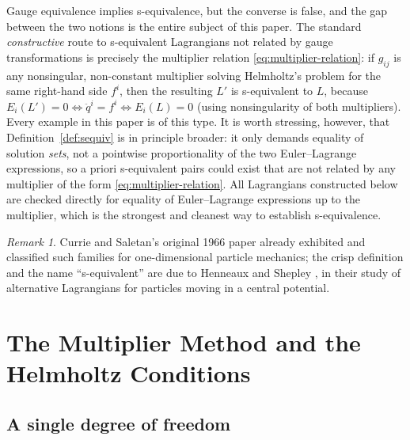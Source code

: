 \documentclass[11pt]{article}
\theoremstyle{remark}
\newtheorem{remark}{Remark}[section]
\begin{document}
Gauge equivalence implies s-equivalence, but the converse is false, and the gap between the two notions is the entire subject of this paper. The standard \emph{constructive} route to s-equivalent Lagrangians not related by gauge transformations is precisely the multiplier relation \eqref{eq:multiplier-relation}: if $g_{ij}$ is any nonsingular, non-constant multiplier solving Helmholtz's problem for the same right-hand side $f^i$, then the resulting $L'$ is s-equivalent to $L$, because $E_i(L')=0 \iff \ddot q^i = f^i \iff E_i(L)=0$ (using nonsingularity of both multipliers). Every example in this paper is of this type. It is worth stressing, however, that Definition~\ref{def:sequiv} is in principle broader: it only demands equality of solution \emph{sets}, not a pointwise proportionality of the two Euler--Lagrange expressions, so a priori s-equivalent pairs could exist that are not related by any multiplier of the form \eqref{eq:multiplier-relation}. All Lagrangians constructed below are checked directly for equality of Euler--Lagrange expressions up to the multiplier, which is the strongest and cleanest way to establish s-equivalence.

\begin{remark}
Currie and Saletan's original 1966 paper \cite{CurrieSaletan1966} already exhibited and classified such families for one-dimensional particle mechanics; the crisp definition and the name ``s-equivalent'' are due to Henneaux and Shepley \cite{HenneauxShepley1982}, in their study of alternative Lagrangians for particles moving in a central potential.
\end{remark}

\section{The Multiplier Method and the Helmholtz Conditions}

\subsection{A single degree of freedom}
\label{sec:helmholtz-1dof}
\end{document}
